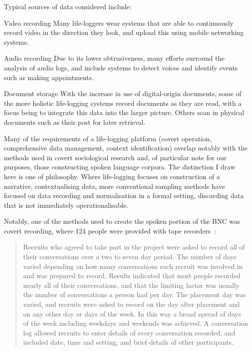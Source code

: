 Typical sources of data considered include:

\begin{itemizeTitle}
    \item[Video recording] Many life-loggers wear systems that are able to continuously record video in the direction they look, and upload this using mobile networking systems.
    \item[Audio recording] Due to its lower obtrusiveness, many efforts surround the analysis of audio logs, and include systems to detect voices and identify events such as making appointments.
    \item[Document storage] With the increase in use of digital-origin documents, some of the more holistic life-logging systems record documents as they are read, with a focus being to integrate this data into the larger picture.  Others scan in physical documents such as their post for later retrieval.
\end{itemizeTitle}

Many of the requirements of a life-logging platform (covert operation, comprehensive data management, context identification) overlap notably with the methods used in covert sociological research and, of particular note for our purposes, those constructing spoken language corpora.  The distinction I draw here is one of philosophy.  Where life-logging focuses on construction of a narrative, contextualising data, more conventional sampling methods have focused on data recording and normalisation in a formal setting, discarding data that is not immediately operationalisable.


Notably, one of the methods used to create the spoken portion of the BNC was covert recording, where 124 people were provided with tape recorders~\cite{burnard1995users}:
\begin{quote}
Recruits who agreed to take part in the project were asked to record all of their conversations over a two to seven day period. The number of days varied depending on how many conversations each recruit was involved in and was prepared to record. Results indicated that most people recorded nearly all of their conversations, and that the limiting factor was usually the number of conversations a person had per day. The placement day was varied, and recruits were asked to record on the day after placement and on any other day or days of the week. In this way a broad spread of days of the week including weekdays and weekends was achieved. A conversation log allowed recruits to enter details of every conversation recorded, and included date, time and setting, and brief details of other participants.
\end{quote}


